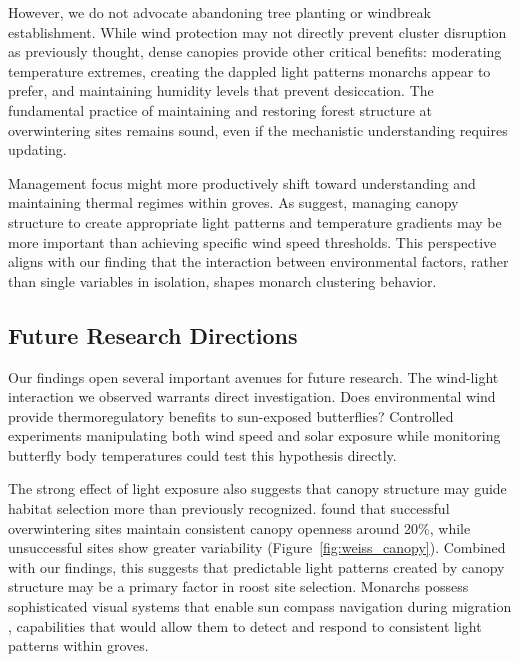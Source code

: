 However, we do not advocate abandoning tree planting or windbreak establishment. While wind protection may not directly prevent cluster disruption as previously thought, dense canopies provide other critical benefits: moderating temperature extremes, creating the dappled light patterns monarchs appear to prefer, and maintaining humidity levels that prevent desiccation. The fundamental practice of maintaining and restoring forest structure at overwintering sites remains sound, even if the mechanistic understanding requires updating.

Management focus might more productively shift toward understanding and maintaining thermal regimes within groves. As \textcite{sanieeHierarchyScaleInfluence2022} suggest, managing canopy structure to create appropriate light patterns and temperature gradients may be more important than achieving specific wind speed thresholds. This perspective aligns with our finding that the interaction between environmental factors, rather than single variables in isolation, shapes monarch clustering behavior.

\subsection{Future Research Directions}

Our findings open several important avenues for future research. The wind-light interaction we observed warrants direct investigation. Does environmental wind provide thermoregulatory benefits to sun-exposed butterflies? Controlled experiments manipulating both wind speed and solar exposure while monitoring butterfly body temperatures could test this hypothesis directly.

The strong effect of light exposure also suggests that canopy structure may guide habitat selection more than previously recognized. \textcite{weissForestCanopyStructure1991} found that successful overwintering sites maintain consistent canopy openness around 20\%, while unsuccessful sites show greater variability (Figure~\ref{fig:weiss_canopy}). Combined with our findings, this suggests that predictable light patterns created by canopy structure may be a primary factor in roost site selection. Monarchs possess sophisticated visual systems that enable sun compass navigation during migration \parencite{nguyenSunCompassNeurons2021,mouritsenVirtualMigrationTethered2002}, capabilities that would allow them to detect and respond to consistent light patterns within groves.


